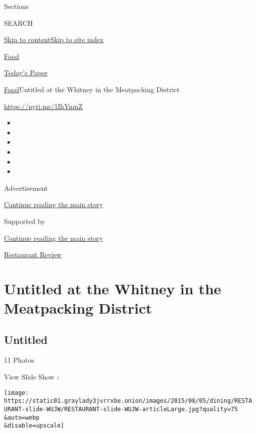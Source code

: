 Sections

SEARCH

\protect\hyperlink{site-content}{Skip to
content}\protect\hyperlink{site-index}{Skip to site index}

\href{https://www.nytimes3xbfgragh.onion/section/food}{Food}

\href{https://myaccount.nytimes3xbfgragh.onion/auth/login?response_type=cookie\&client_id=vi}{}

\href{https://www.nytimes3xbfgragh.onion/section/todayspaper}{Today's
Paper}

\href{/section/food}{Food}\textbar{}Untitled at the Whitney in the
Meatpacking District

\url{https://nyti.ms/1IhYnmZ}

\begin{itemize}
\item
\item
\item
\item
\item
\item
\end{itemize}

Advertisement

\protect\hyperlink{after-top}{Continue reading the main story}

Supported by

\protect\hyperlink{after-sponsor}{Continue reading the main story}

\href{/column/restaurant-review}{Restaurant Review}

\hypertarget{untitled-at-the-whitney-in-the-meatpacking-district}{%
\section{Untitled at the Whitney in the Meatpacking
District}\label{untitled-at-the-whitney-in-the-meatpacking-district}}

\href{https://www.nytimes3xbfgragh.onion/slideshow/2015/08/05/dining/untitled-at-the-whitney.html}{}

\hypertarget{untitled}{%
\subsection{Untitled}\label{untitled}}

11 Photos

View Slide Show ›

\texttt{[image: https://static01.graylady3jvrrxbe.onion/images/2015/08/05/dining/RESTAURANT-slide-WUJW/RESTAURANT-slide-WUJW-articleLarge.jpg?quality=75\\\&auto=webp\\\&disable=upscale]}

